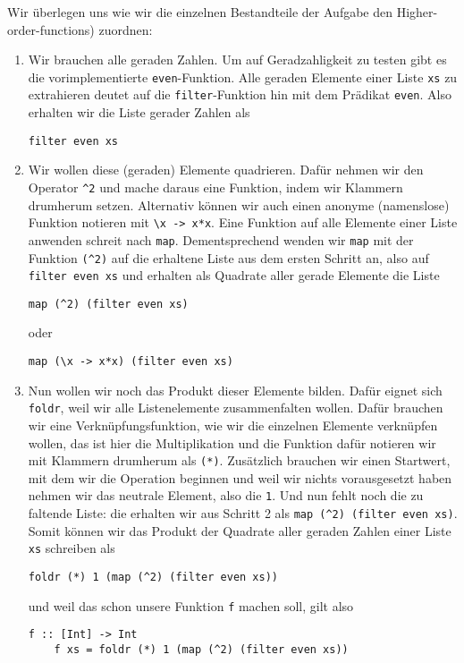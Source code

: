\documentclass[ngerman, a4paper, 11pt]{article}
\theoremstyle{nonumberplain}
\begin{document}
Wir überlegen uns wie wir die einzelnen Bestandteile der Aufgabe den Higher-order-functions) zuordnen:
\begin{enumerate}
	\item  Wir brauchen alle geraden Zahlen. Um auf Geradzahligkeit zu testen gibt es die vorimplementierte \texttt{even}-Funktion. Alle geraden Elemente einer Liste \texttt{xs} zu extrahieren deutet auf die \texttt{filter}-Funktion hin mit dem Prädikat \texttt{even}. Also erhalten wir die Liste gerader Zahlen als 
	\begin{lstlisting}[style=noframe]
		filter even xs
	\end{lstlisting}
	\item  Wir wollen diese (geraden) Elemente quadrieren. Dafür nehmen wir den Operator \lstinline{^2} und mache daraus eine Funktion, indem wir Klammern drumherum setzen. Alternativ können wir auch einen anonyme (namenslose) Funktion notieren mit \lstinline|\x -> x*x|. Eine Funktion auf alle Elemente einer Liste anwenden schreit nach \texttt{map}. Dementsprechend wenden wir \texttt{map} mit der Funktion \lstinline{(^2)} auf die erhaltene Liste aus dem ersten Schritt an, also auf \texttt{filter even xs} und erhalten als Quadrate aller gerade Elemente die Liste
	\begin{lstlisting}[style=noframe]
		map (^2) (filter even xs)
	\end{lstlisting}
	oder
	\begin{lstlisting}[style=noframe]
		map (\x -> x*x) (filter even xs)
	\end{lstlisting}
	\item  Nun wollen wir noch das Produkt dieser Elemente bilden. Dafür eignet sich \texttt{foldr}, weil wir alle Listenelemente zusammenfalten wollen. Dafür brauchen wir eine Verknüpfungsfunktion, wie wir die einzelnen Elemente verknüpfen wollen, das ist hier die Multiplikation und die Funktion dafür notieren wir mit Klammern drumherum als \texttt{(*)}. Zusätzlich brauchen wir einen Startwert, mit dem wir die Operation beginnen und weil wir nichts vorausgesetzt haben nehmen wir das neutrale Element, also die \texttt{1}. Und nun fehlt noch die zu faltende Liste: die erhalten wir aus Schritt 2 als \lstinline{map (^2) (filter even xs)}. Somit können wir das Produkt der Quadrate aller geraden Zahlen einer Liste \texttt{xs} schreiben als
	\begin{lstlisting}[style=noframe]
		foldr (*) 1 (map (^2) (filter even xs))
	\end{lstlisting}
	und weil das schon unsere Funktion \texttt{f} machen soll, gilt also
	\begin{lstlisting}[style=frame]
	f :: [Int] -> Int
	f xs = foldr (*) 1 (map (^2) (filter even xs))
	\end{lstlisting}
\end{enumerate}
\end{document}
